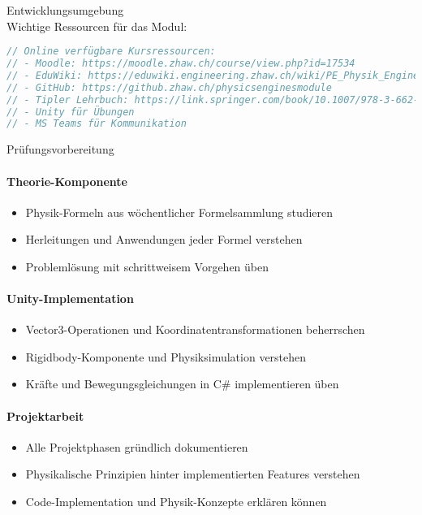 \begin{code}{Entwicklungsumgebung}\\
    Wichtige Ressourcen für das Modul:
\begin{lstlisting}[language=C, style=basesmol]
// Online verfügbare Kursressourcen:
// - Moodle: https://moodle.zhaw.ch/course/view.php?id=17534
// - EduWiki: https://eduwiki.engineering.zhaw.ch/wiki/PE_Physik_Engines
// - GitHub: https://github.zhaw.ch/physicsenginesmodule
// - Tipler Lehrbuch: https://link.springer.com/book/10.1007/978-3-662-58281-7
// - Unity für Übungen
// - MS Teams für Kommunikation
\end{lstlisting}
\end{code}

\begin{KR}{Prüfungsvorbereitung}\\
    \paragraph{Theorie-Komponente}
    \begin{itemize}
        \item Physik-Formeln aus wöchentlicher Formelsammlung studieren
        \item Herleitungen und Anwendungen jeder Formel verstehen
        \item Problemlösung mit schrittweisem Vorgehen üben
    \end{itemize}
    
    \paragraph{Unity-Implementation}
    \begin{itemize}
        \item Vector3-Operationen und Koordinatentransformationen beherrschen
        \item Rigidbody-Komponente und Physiksimulation verstehen
        \item Kräfte und Bewegungsgleichungen in C\# implementieren üben
    \end{itemize}
    
    \paragraph{Projektarbeit}
    \begin{itemize}
        \item Alle Projektphasen gründlich dokumentieren
        \item Physikalische Prinzipien hinter implementierten Features verstehen
        \item Code-Implementation und Physik-Konzepte erklären können
    \end{itemize}
\end{KR}


